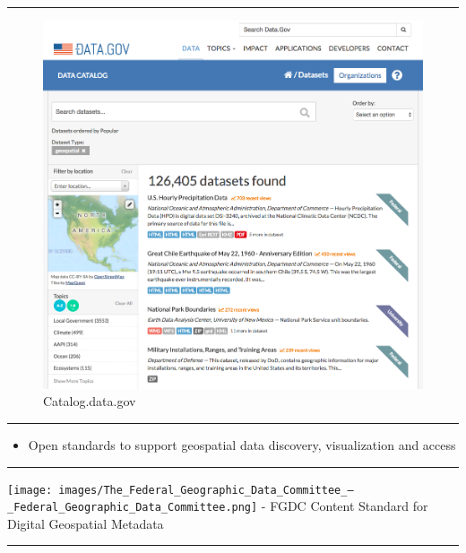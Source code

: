 \begin{center}\rule{0.5\linewidth}{\linethickness}\end{center}

\begin{figure}[htbp]
\centering
\includegraphics{images/Search_for_a_Dataset_-_Data_gov.png}
\caption{Catalog.data.gov}
\end{figure}

\begin{center}\rule{0.5\linewidth}{\linethickness}\end{center}

\begin{itemize}
\itemsep1pt\parskip0pt
\item
  Open standards to support geospatial data discovery, visualization and
  access
\end{itemize}

\begin{center}\rule{0.5\linewidth}{\linethickness}\end{center}

\texttt{[image: images/The\_Federal\_Geographic\_Data\_Committee\_—\_Federal\_Geographic\_Data\_Committee.png]}
- FGDC Content Standard for Digital Geospatial Metadata

\begin{center}\rule{0.5\linewidth}{\linethickness}\end{center}

